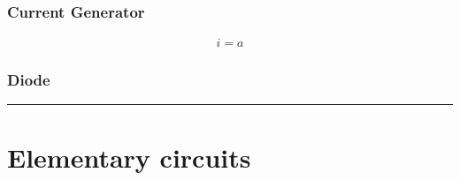 \documentclass[letterpaper,10pt,english]{jupyterBook}
\begin{document}
\subsubsection{Current Generator}
\label{\detokenize{ch/circuits-electric-components:current-generator}}\label{\detokenize{ch/circuits-electric-components:physics-hs-electromagnetism-circuits-electric-components-generator-i}}\begin{equation*}
\begin{split}i = a\end{split}
\end{equation*}

\subsubsection{Diode}
\label{\detokenize{ch/circuits-electric-components:diode}}\label{\detokenize{ch/circuits-electric-components:physics-hs-electromagnetism-circuits-electric-components-diode}}
\sphinxAtStartPar
{}


\bigskip\hrule\bigskip


\sphinxstepscope


\section{Elementary circuits}
\label{\detokenize{ch/circuits-electric-elementary-connections:elementary-circuits}}\label{\detokenize{ch/circuits-electric-elementary-connections:physics-hs-electromagnetism-circuits-electric-components-configurations}}\label{\detokenize{ch/circuits-electric-elementary-connections::doc}}
\end{document}
